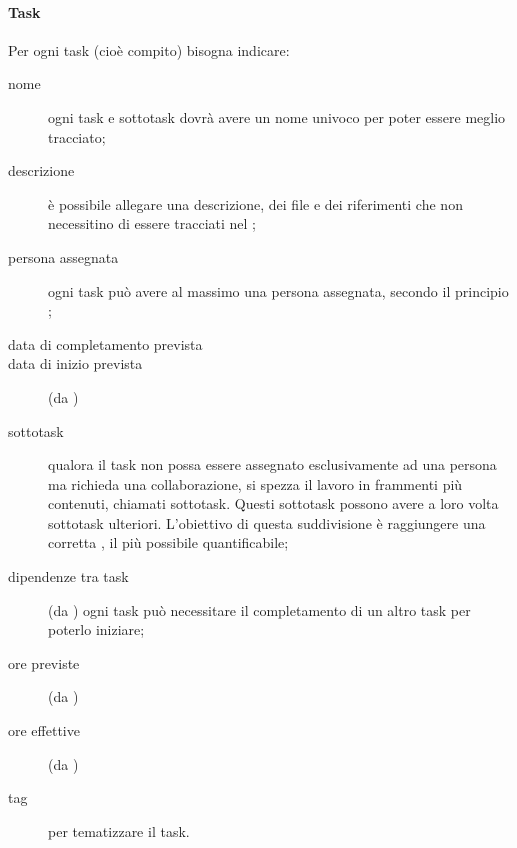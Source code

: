 \paragraph{Task} Per ogni task (cioè compito) bisogna indicare:
\begin{description}
	\item[nome] ogni task e sottotask dovrà avere un nome univoco per poter essere meglio tracciato;
	\item[descrizione] è possibile allegare una descrizione, dei file e dei riferimenti che non necessitino di essere tracciati nel ;
	\item[persona assegnata] ogni task può avere al massimo una persona assegnata, secondo il principio ; 
	\item[data di completamento prevista]
	\item[data di inizio prevista] (da )
	\item[sottotask] qualora il task non possa essere assegnato esclusivamente ad una persona ma richieda una collaborazione, si spezza il lavoro in frammenti più contenuti, chiamati sottotask. Questi sottotask possono avere a loro volta sottotask ulteriori. L'obiettivo di questa suddivisione è raggiungere una corretta , il più possibile quantificabile;
	\item[dipendenze tra task] (da ) ogni task può necessitare il completamento di un altro task per poterlo iniziare;
	\item[ore previste] (da )
	\item[ore effettive] (da )
	\item[tag] per tematizzare il task.
\end{description}
